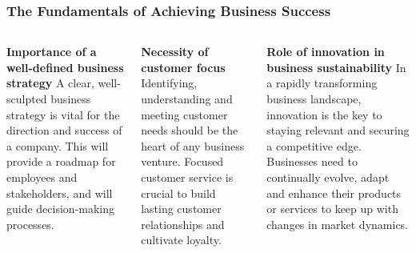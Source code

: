 \documentclass[5pt]{beamer}
\begin{document}
\begin{frame}
\frametitle{The Fundamentals of Achieving Business Success}
\begin{columns}
\begin{column}{0.3\textwidth}
\begin{block}{\textbf{Importance of a well-defined business strategy}}
A clear, well-sculpted business strategy is vital for the direction and success of a company. This will provide a roadmap for employees and stakeholders, and will guide decision-making processes.
\end{block}
\end{column}
\begin{column}{0.3\textwidth}
\begin{block}{\textbf{Necessity of customer focus}}
Identifying, understanding and meeting customer needs should be the heart of any business venture. Focused customer service is crucial to build lasting customer relationships and cultivate loyalty.
\end{block}
\end{column}
\begin{column}{0.3\textwidth}
\begin{block}{\textbf{Role of innovation in business sustainability}}
In a rapidly transforming business landscape, innovation is the key to staying relevant and securing a competitive edge. Businesses need to continually evolve, adapt and enhance their products or services to keep up with changes in market dynamics.
\end{block}
\end{column}
\end{columns}
\end{frame}
\end{document}
